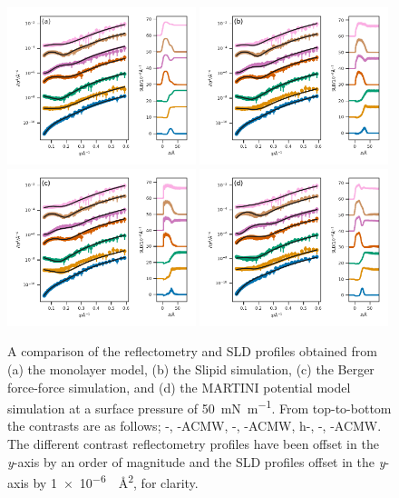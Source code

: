 \documentclass[amsmath,amssymb,superscriptaddress]{revtex4-1}
\begin{document}
%
%
\begin{figure}
 \centering
 \includegraphics[width=0.49\textwidth]{dspc_50_ref_sld}
 \includegraphics[width=0.49\textwidth]{dspc_slipids_50_ref_sld} \\
 \includegraphics[width=0.49\textwidth]{dspc_berger_50_ref_sld}
 \includegraphics[width=0.49\textwidth]{dspc_martini_50_ref_sld}
 \caption{A comparison of the reflectometry and SLD profiles obtained from (a) the monolayer model, (b) the Slipid simulation, (c) the Berger force-force simulation, and (d) the MARTINI potential model simulation at a surface pressure of \SI{50}{\milli\newton\per\meter}. From top-to-bottom the contrasts are as follows; -, -ACMW, -, -ACMW, h-, -, -ACMW. The different contrast reflectometry profiles have been offset in the \emph{y}-axis by an order of magnitude and the SLD profiles offset in the \emph{y}-axis by \SI{1e-6}{\per\square\angstrom}, for clarity.}
 \label{fig:sp50}
\end{figure}
\end{document}
